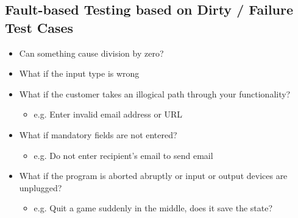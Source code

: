 \documentclass[a4paper]{article}
\begin{document}
\subsection{Fault-based Testing based on Dirty / Failure Test Cases}
\begin{itemize}
	\item Can something cause division by zero?
	\item What if the input type is wrong
	\item What if the customer takes an illogical path through your functionality?
	\begin{itemize}[label=$\circ$]
		\item e.g. Enter invalid email address or URL
	\end{itemize}
	\item What if mandatory fields are not entered?
	\begin{itemize}[label=$\circ$]
		\item e.g. Do not enter recipient’s email to send email
	\end{itemize}
	\item What if the program is aborted abruptly or input or output devices are unplugged?
	\begin{itemize}[label=$\circ$]
		\item e.g. Quit a game suddenly in the middle, does it save the state?
	\end{itemize}
\end{itemize}
\end{document}
